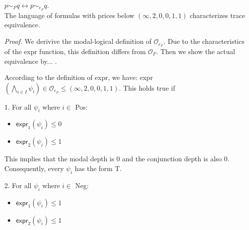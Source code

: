 \begin{isabellebody}
\isamarkupfalse%
%
\isadelimdocument
%
\endisadelimdocument
%
\isatagdocument
%
\isamarkuptrue%
%
\endisatagdocument
{\isafolddocument}%
%
\isadelimdocument
%
\endisadelimdocument
%
\begin{isamarkuptext}%
$p \sim_F q \longleftrightarrow p \sim_{e_F} q$. \\
The language of formulas with prices below $(\infty, 2, 0, 0, 1, 1)$ characterizes trace equivalence.

\textit{Proof.} We derivive the modal-logical definition of $\mathcal{O}_{e_F}$. Due to the characteristics of the \textsf{expr} function, 
this definition differs from $\mathcal{O}_F$. Then we show the actual equivalence by... .

According to the definition of \textsf{expr}, we have: \textsf{expr}$(\bigwedge_{i\in I} \psi_i)\in\mathcal{O}_{e_F} \leq (\infty, 2, 0, 0, 1, 1)$. This holds true if

1. For all $\psi_i$ where $i\in$ Pos:
   \begin{itemize}
     \item $\textsf{expr}_1(\psi_i) \leq 0$ 
     \item $\textsf{expr}_2(\psi_i) \leq 1$
   \end{itemize}
   
   This implies that the modal depth is 0 and the conjunction depth is also 0. Consequently, every $\psi_i$ has the form \textsf{T}.

2. For all $\psi_i$ where $i\in$ Neg:
   \begin{itemize}
     \item $\textsf{expr}_1(\psi_i) \leq 1$ 
     \item $\textsf{expr}_2(\psi_i) \leq 1$
   \end{itemize}
   

\end{isamarkuptext}
\end{isabellebody}
